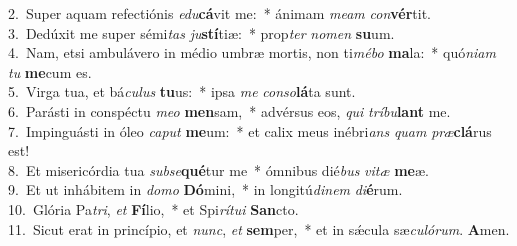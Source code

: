 {2.~}Super aquam refectiónis \textit{e}\textit{du}\textbf{cá}vit me:~* ánimam \textit{me}\textit{am} \textit{con}\textbf{vér}tit.\\
{3.~}Dedúxit me super sémi\textit{tas} \textit{ju}\textbf{stí}tiæ:~* prop\textit{ter} \textit{no}\textit{men} \textbf{su}um.\\
{4.~}Nam, etsi ambulávero in médio umbræ mortis, non ti\textit{mé}\textit{bo} \textbf{ma}la:~* quó\textit{ni}\textit{am} \textit{tu} \textbf{me}cum es.\\
{5.~}Virga tua, et bá\textit{cu}\textit{lus} \textbf{tu}us:~* ipsa \textit{me} \textit{con}\textit{so}\textbf{lá}ta sunt.\\
{6.~}Parásti in conspéctu \textit{me}\textit{o} \textbf{men}sam,~* advérsus eos, \textit{qui} \textit{trí}\textit{bu}\textbf{lant} me.\\
{7.~}Impinguásti in óleo \textit{ca}\textit{put} \textbf{me}um:~* et calix meus inébri\textit{ans} \textit{quam} \textit{præ}\textbf{clá}rus est!\\
{8.~}Et misericórdia tua \textit{sub}\textit{se}\textbf{qué}tur me~* ómnibus dié\textit{bus} \textit{vi}\textit{tæ} \textbf{me}æ.\\
{9.~}Et ut inhábitem in \textit{do}\textit{mo} \textbf{Dó}mini,~* in longitú\textit{di}\textit{nem} \textit{di}\textbf{é}rum.\\
{10.~}Glória Pa\textit{tri}, \textit{et} \textbf{Fí}lio,~* et Spi\textit{rí}\textit{tu}\textit{i} \textbf{San}cto.\\
{11.~}Sicut erat in princípio, et \textit{nunc}, \textit{et} \textbf{sem}per,~* et in sǽcula sæ\textit{cu}\textit{ló}\textit{rum}. \textbf{A}men.\\
